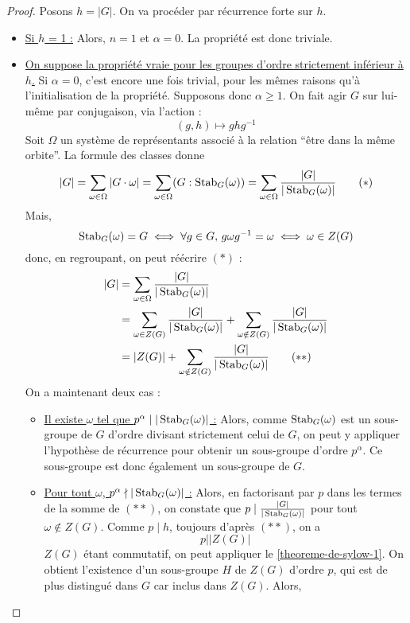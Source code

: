   \begin{proof}
    Posons $h = \vert G \vert$. On va procéder par récurrence forte sur $h$.
    \begin{itemize}
      \item \uline{Si $h$ = 1 :} Alors, $n = 1$ et $\alpha = 0$. La propriété est donc triviale.
      \item \uline{On suppose la propriété vraie pour les groupes d'ordre strictement inférieur à $h$.} Si $\alpha = 0$, c'est encore une fois trivial, pour les mêmes raisons qu'à l'initialisation de la propriété. Supposons donc $\alpha \geq 1$. On fait agir $G$ sur lui-même par conjugaison, via l'action :
      \[ (g,h) \mapsto ghg^{-1} \]
      Soit $\Omega$ un système de représentants associé à la relation ``être dans la même orbite''. La formule des classes donne
      \[ |G| = \sum_{\omega \in \Omega} |G \cdot \omega| = \sum_{\omega \in \Omega} (G : \operatorname{Stab}_G(\omega)) = \sum_{\omega \in \Omega} \frac{|G|}{|\operatorname{Stab}_G(\omega)|} \tag{$*$} \]
      Mais,
      \[ \operatorname{Stab}_G(\omega) = G \iff \forall g \in G, \, g \omega g^{-1} = \omega \iff \omega \in Z(G) \]
      donc, en regroupant, on peut réécrire $(*)$ :
      \begin{align*}
        |G| &= \sum_{\omega \in \Omega} \frac{|G|}{|\operatorname{Stab}_G(\omega)|} \\
        & = \sum_{\omega \in Z(G)} \frac{|G|}{|\operatorname{Stab}_G(\omega)|} + \sum_{\omega \notin Z(G)} \frac{|G|}{|\operatorname{Stab}_G(\omega)|} \\
        &= \vert Z(G) \vert + \sum_{\omega \notin Z(G)} \frac{|G|}{|\operatorname{Stab}_G(\omega)|} \tag{$**$}
      \end{align*}
      On a maintenant deux cas :
      \begin{itemize}
        \item \uline{Il existe $\omega$ tel que $p^\alpha \mid |\operatorname{Stab}_G(\omega)|$ :} Alors, comme $\operatorname{Stab}_G(\omega)$ est un sous-groupe de $G$ d'ordre divisant strictement celui de $G$, on peut y appliquer l'hypothèse de récurrence pour obtenir un sous-groupe d'ordre $p^\alpha$. Ce sous-groupe est donc également un sous-groupe de $G$.
        \item \uline{Pour tout $\omega$, $p^\alpha \nmid |\operatorname{Stab}_G(\omega)|$ :} Alors, en factorisant par $p$ dans les termes de la somme de $(**)$, on constate que $p \mid \frac{|G|}{|\operatorname{Stab}_G(\omega)|}$ pour tout $\omega \notin Z(G)$. Comme $p \mid h$, toujours d'après $(**)$, on a
        \[ p \mid \vert Z(G) \vert \]
        $Z(G)$ étant commutatif, on peut appliquer le \cref{theoreme-de-sylow-1}. On obtient l'existence d'un sous-groupe $H$ de $Z(G)$ d'ordre $p$, qui est de plus distingué dans $G$ car inclus dans $Z(G)$. Alors,

\end{itemize}
\end{itemize}
\end{proof}
